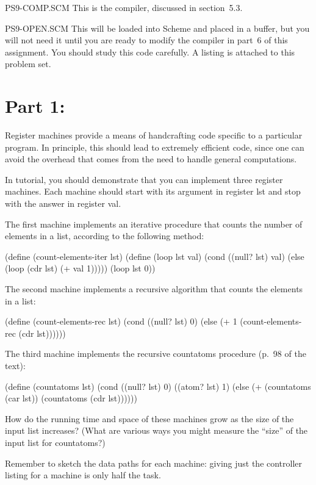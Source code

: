 {\cf PS9-COMP.SCM }
This is the compiler, discussed in section~5.3.

{\cf PS9-OPEN.SCM } This will be loaded into {\sc Scheme} and
placed in a buffer, but you will not need it until you are ready to
modify the compiler in part~6 of this assignment.  You should study this code
carefully.  A listing is attached to this problem set.

\section{Part 1:  }

Register machines provide a means of handcrafting code specific to a
particular program.  In principle, this should lead to extremely
efficient code, since one can avoid the overhead that comes from the
need to handle general computations.

  In tutorial, you should demonstrate that you
can implement three register machines.  Each machine should start with
its argument in register {\cf lst} and stop with the answer in
register {\cf val}.

The first machine implements an iterative procedure that counts the
number of elements in a list, according to the following method:

\beginlisp
(define (count-elements-iter lst)
  (define (loop lst val)
    (cond ((null? lst) val)
          (else (loop (cdr lst) (+ val 1)))))
  (loop lst 0))
\endlisp

The second machine implements a recursive algorithm that counts the
elements in a list:

\beginlisp
(define (count-elements-rec lst)
  (cond ((null? lst) 0)
        (else (+ 1 (count-elements-rec (cdr lst))))))
\endlisp

The third machine implements the recursive {\cf countatoms} procedure
(p.~98 of the text):

\beginlisp
(define (countatoms lst)
  (cond ((null? lst) 0)
        ((atom? lst) 1)
        (else (+ (countatoms (car lst))
                 (countatoms (cdr lst))))))
\endlisp

How do the running time and space of these machines grow as the size of
the input list increases? (What are various ways you might measure the
``size'' of the input list for {\cf countatoms}?)

Remember to sketch the data paths for each machine: giving just the controller
listing for a machine is only half the task.

